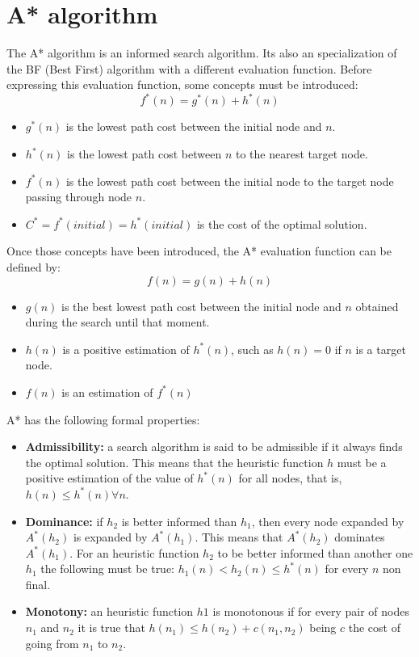 \documentclass[11pt]{llncs}
\begin{document}
\section{A* algorithm}\label{astar_alg}
The A* algorithm \cite{inteligencia_artificial,artificial_intelligence} is an informed search algorithm. Its also an specialization of the BF (Best First) algorithm with a different evaluation function. Before expressing this evaluation function, some concepts must be introduced:
\[f^{*}(n) = g^{*}(n) + h^{*}(n)\]
\begin{itemize}
    \item $g^{*}(n)$ is the lowest path cost between the initial node and $n$.
    \item $h^{*}(n)$ is the lowest path cost between $n$ to the nearest target node.
    \item $f^{*}(n)$ is the lowest path cost between the initial node to the target node passing through node $n$. 
    \item $C^{*} = f^{*}(initial) = h^{*}(initial)$ is the cost of the optimal solution. 
\end{itemize}

Once those concepts have been introduced, the A* evaluation function can be defined by:
\[f(n) = g(n) + h(n)\]
\begin{itemize}
    \item $g(n)$ is the best lowest path cost between the initial node and $n$ obtained during the search until that moment.
    \item $h(n)$ is a positive estimation of $h^{*}(n)$, such as $h(n) = 0$ if $n$ is a target node.
    \item $f(n)$ is an estimation of $f^{*}(n)$
\end{itemize}

A* has the following formal properties:
\begin{itemize}
    \item \textbf{Admissibility:} a search algorithm is said to be admissible if it always finds the optimal solution. This means that the heuristic function $h$ must be a positive estimation of the value of $h^{*}(n)$ for all nodes, that is, $h(n) \leq h^{*}(n) \forall n$. 
    \item \textbf{Dominance:} if $h_2$ is better informed than $h_1$, then every node expanded by $A^{*}(h_2)$ is expanded by $A^{*}(h_1)$. This means that $A^{*}(h_2)$ dominates $A^{*}(h_1)$. For an heuristic function $h_2$ to be better informed than another one $h_1$ the following must be true: $h_1(n) < h_2(n) \leq h^{*}(n)$ for every $n$ non final.
    \item \textbf{Monotony:} an heuristic function $h1$ is monotonous if for every pair of nodes $n_1$ and $n_2$ it is true that $h(n_1) \leq h(n_2) + c(n_1, n_2)$ being $c$ the cost of going from $n_1$ to $n_2$.
\end{itemize}
\end{document}
